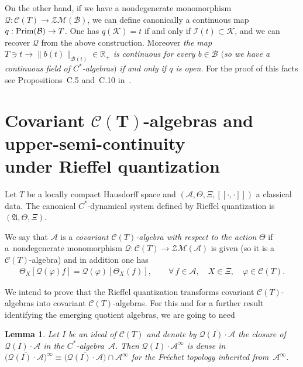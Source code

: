 \documentclass[11pt]{article}
\def\A{{\mathcal A}}
\def\Th{\Theta}
\def\AA{\mathfrak A}
\def\C{\mathcal{C}}
\def\B{{\mathcal B}}
\def\Q{\mathcal Q}
\newtheorem{Lemma}[Theorem]{Lemma}
\begin{document}
On the other hand, if we have a nondegenerate monomorphism $\Q:\C(T)\to \mathcal Z\mathcal M(\B)$, we can def\/ine canonically
a continuous map $q:{\rm Prim}(\B)\to T$. One has $q(\mathcal K)=t$ if and only if $\mathcal I(t)\subset \mathcal K$,
and we can recover $\Q$ from the above construction.
Moreover {\it the map $T\ni t\to\| b(t)\|_{\B(t)}\in\mathbb R_+$ is continuous
for every $b\in\B$ $($so we have a continuous field of $C^*$-algebras$)$ if and only if $q$ is open}.
For the proof of this facts see Propositions~C.5 and~C.10 in~\cite{Wi}.



\section[Covariant $\C(T)$-algebras and upper-semi-continuity under Rieffel quantization]{Covariant $\boldsymbol{\C(T)}$-algebras and upper-semi-continuity\\ under Rief\/fel quantization}\label{isra}


Let $T$ be a locally compact Hausdorf\/f space and $(\A,\Th,\Xi,[\![\cdot,\cdot]\!])$ a classical data.
The canonical $C^*$-dynamical system def\/ined by Rief\/fel quantization is $(\AA,\Th,\Xi)$.

\begin{Definition}\label{cedete+}
We say that $\A$ is a {\it covariant $\C(T)$-algebra with respect to the action} $\Th$
if a~nondegenerate monomorphism $\Q:\C(T)\rightarrow\mathcal Z\mathcal M(\A)$ is given
(so it is a $\C(T)$-algebra) and in addition one has
\begin{gather}\label{incep}
\Th_X[\Q(\varphi)f]=\Q(\varphi)\left[\Th_X(f)\right],\qquad \forall\,f\in\A,\quad X\in\Xi,\quad \varphi\in\C(T) .
\end{gather}
\end{Definition}

We intend to prove that the Rief\/fel quantization transforms covariant $\C(T)$-algebras into covariant $\C(T)$-algebras.
For this and for a further result identifying the emerging quotient algebras, we are going to need

\begin{Lemma}\label{densly}
Let $I$ be an ideal of $\C(T)$ and denote by $\overline{\Q(I)\cdot\A}$ the closure of $\Q(I)\cdot\A$ in the $C^*$-algebra~$\A$.
Then $\Q(I)\cdot\A^\infty$ is dense in
$\big(\overline{\Q(I)\cdot\A}\big)^\infty\equiv\big(\overline{\Q(I)\cdot\A}\big)\cap\A^\infty$
for the Fr\'echet topology inherited from~$\A^\infty$.
\end{Lemma}
\end{document}
